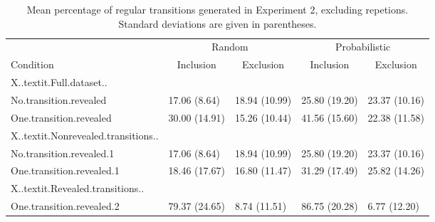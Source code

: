 \begin{appendix}
\begin{table}[hp]
\begin{center}
\begin{threeparttable}
\end{threeparttable}
\end{center}

\end{table}

\begin{table}[hp]

\begin{center}
\begin{threeparttable}

\caption{\label{tab:appendix-pdl7-generation}Mean percentage of regular transitions generated in Experiment 2, excluding repetions. Standard deviations are given in parentheses.}

\begin{tabular}{lllll}
\toprule
 & \multicolumn{2}{c}{Random} & \multicolumn{2}{c}{Probabilistic} \\
\cmidrule(r){2-3} \cmidrule(r){4-5}
Condition & \multicolumn{1}{c}{Inclusion} & \multicolumn{1}{c}{Exclusion} & \multicolumn{1}{c}{Inclusion} & \multicolumn{1}{c}{Exclusion}\\
\midrule
X..textit.Full.dataset.. &  &  &  & \\
No.transition.revealed & 17.06 (8.64) & 18.94 (10.99) & 25.80 (19.20) & 23.37 (10.16)\\
One.transition.revealed & 30.00 (14.91) & 15.26 (10.44) & 41.56 (15.60) & 22.38 (11.58)\\
X..textit.Nonrevealed.transitions.. &  &  &  & \\
No.transition.revealed.1 & 17.06 (8.64) & 18.94 (10.99) & 25.80 (19.20) & 23.37 (10.16)\\
One.transition.revealed.1 & 18.46 (17.67) & 16.80 (11.47) & 31.29 (17.49) & 25.82 (14.26)\\
X..textit.Revealed.transitions.. &  &  &  & \\
One.transition.revealed.2 & 79.37 (24.65) & 8.74 (11.51) & 86.75 (20.28) & 6.77 (12.20)\\
\bottomrule
\end{tabular}

\end{threeparttable}
\end{center}

\end{table}

\begin{table}[hp]

\begin{center}
\begin{threeparttable}


\end{threeparttable}
\end{center}
\end{table}
\end{appendix}

